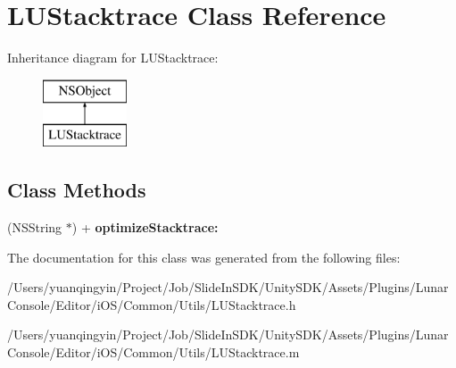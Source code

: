 \hypertarget{interface_l_u_stacktrace}{}\section{L\+U\+Stacktrace Class Reference}
\label{interface_l_u_stacktrace}
Inheritance diagram for L\+U\+Stacktrace\+:\begin{figure}[H]
\begin{center}
\leavevmode
\includegraphics[height=2.000000cm]{interface_l_u_stacktrace}
\end{center}
\end{figure}
\subsection*{Class Methods}
\begin{DoxyCompactItemize}
\item 
\mbox{\label{interface_l_u_stacktrace_a272091fc4901df64a6644cc893dc3ea4}} 
(N\+S\+String $\ast$) + {\bfseries optimize\+Stacktrace\+:}
\end{DoxyCompactItemize}


The documentation for this class was generated from the following files\+:\begin{DoxyCompactItemize}
\item 
/\+Users/yuanqingyin/\+Project/\+Job/\+Slide\+In\+S\+D\+K/\+Unity\+S\+D\+K/\+Assets/\+Plugins/\+Lunar\+Console/\+Editor/i\+O\+S/\+Common/\+Utils/L\+U\+Stacktrace.\+h\item 
/\+Users/yuanqingyin/\+Project/\+Job/\+Slide\+In\+S\+D\+K/\+Unity\+S\+D\+K/\+Assets/\+Plugins/\+Lunar\+Console/\+Editor/i\+O\+S/\+Common/\+Utils/L\+U\+Stacktrace.\+m\end{DoxyCompactItemize}
